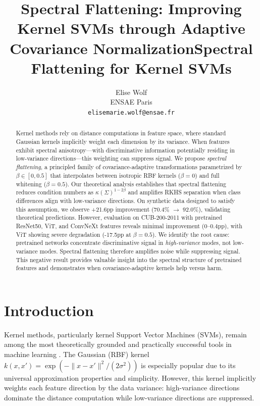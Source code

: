 \documentclass[11pt]{article}
\title{Spectral Flattening: Improving Kernel SVMs through Adaptive Covariance Normalization}
\author{
  Elise Wolf \\
  ENSAE Paris \\
  \texttt{elisemarie.wolf@ensae.fr}
}
\title{Spectral Flattening for Kernel SVMs}
\begin{document}
\maketitle

\begin{abstract}
Kernel methods rely on distance computations in feature space, where standard Gaussian kernels implicitly weight each dimension by its variance. When features exhibit spectral anisotropy---with discriminative information potentially residing in low-variance directions---this weighting can suppress signal. We propose \emph{spectral flattening}, a principled family of covariance-adaptive transformations parametrized by $\beta \in [0, 0.5]$ that interpolates between isotropic RBF kernels ($\beta=0$) and full whitening ($\beta=0.5$). Our theoretical analysis establishes that spectral flattening reduces condition numbers as $\kappa(\Sigma)^{1-2\beta}$ and amplifies RKHS separation when class differences align with low-variance directions. On synthetic data designed to satisfy this assumption, we observe +21.6pp improvement (70.4\% $\to$ 92.0\%), validating theoretical predictions. However, evaluation on CUB-200-2011 with pretrained ResNet50, ViT, and ConvNeXt features reveals minimal improvement (0--0.4pp), with ViT showing severe degradation (-17.5pp at $\beta=0.5$). We identify the root cause: pretrained networks concentrate discriminative signal in \emph{high-variance} modes, not low-variance modes. Spectral flattening therefore amplifies noise while suppressing signal. This negative result provides valuable insight into the spectral structure of pretrained features and demonstrates when covariance-adaptive kernels help versus harm.
\end{abstract}

\section{Introduction}

Kernel methods, particularly kernel Support Vector Machines (SVMs), remain among the most theoretically grounded and practically successful tools in machine learning \cite{scholkopf2002learning}. The Gaussian (RBF) kernel $k(x,x') = \exp(-\|x-x'\|^2/(2\sigma^2))$ is especially popular due to its universal approximation properties and simplicity. However, this kernel implicitly weights each feature direction by the data variance: high-variance directions dominate the distance computation while low-variance directions are suppressed.
\end{document}
